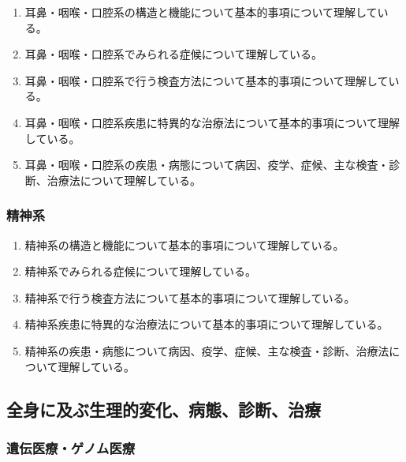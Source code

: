 \begin{enumerate}
\def\labelenumi{\arabic{enumi}.}
\tightlist
\item
  耳鼻・咽喉・口腔系の構造と機能について基本的事項について理解している。
\item
  耳鼻・咽喉・口腔系でみられる症候について理解している。
\item
  耳鼻・咽喉・口腔系で行う検査方法について基本的事項について理解している。
\item
  耳鼻・咽喉・口腔系疾患に特異的な治療法について基本的事項について理解している。
\item
  耳鼻・咽喉・口腔系の疾患・病態について病因、疫学、症候、主な検査・診断、治療法について理解している。
\end{enumerate}

\hypertarget{ux7cbeux795eux7cfb}{%
\subsubsection{精神系}\label{ux7cbeux795eux7cfb}}

\begin{enumerate}
\def\labelenumi{\arabic{enumi}.}
\tightlist
\item
  精神系の構造と機能について基本的事項について理解している。
\item
  精神系でみられる症候について理解している。
\item
  精神系で行う検査方法について基本的事項について理解している。
\item
  精神系疾患に特異的な治療法について基本的事項について理解している。
\item
  精神系の疾患・病態について病因、疫学、症候、主な検査・診断、治療法について理解している。
\end{enumerate}

\hypertarget{ux5168ux8eabux306bux53caux3076ux751fux7406ux7684ux5909ux5316ux75c5ux614bux8a3aux65adux6cbbux7642}{%
\subsection{全身に及ぶ生理的変化、病態、診断、治療}\label{ux5168ux8eabux306bux53caux3076ux751fux7406ux7684ux5909ux5316ux75c5ux614bux8a3aux65adux6cbbux7642}}

\hypertarget{ux907aux4f1dux533bux7642ux30b2ux30ceux30e0ux533bux7642}{%
\subsubsection{遺伝医療・ゲノム医療}\label{ux907aux4f1dux533bux7642ux30b2ux30ceux30e0ux533bux7642}}

